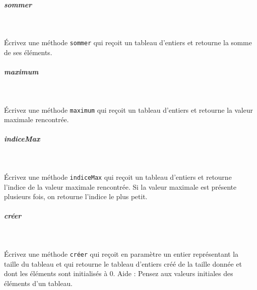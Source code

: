 \documentclass[11pt,a4paper]{article}
\begin{document}
			
		\subparagraph{sommer} 
		
					\textcolor{white}{.} \par
				
            \par
        
					\'Ecrivez une m\'ethode 
					\verb|sommer| 
					qui re\c coit un tableau d'entiers
					et retourne la somme de ses \'el\'ements.
				
            \par
        
			
		\subparagraph{maximum} 
		
					\textcolor{white}{.} \par
				
            \par
        
					\'Ecrivez une m\'ethode 
					\verb|maximum| 
					qui re\c coit un tableau d'entiers
					et retourne la valeur maximale rencontr\'ee.
				
            \par
        
			
		\subparagraph{indiceMax} 
		
					\textcolor{white}{.} \par
				
            \par
        
					\'Ecrivez une m\'ethode 
					\verb|indiceMax|
					qui re\c coit un tableau d'entiers
					et retourne l'indice de la valeur maximale rencontr\'ee.
					Si la valeur maximale est pr\'esente plusieurs fois,
					on retourne l'indice le plus petit.
				
            \par
        
			
		\subparagraph{cr\'eer} 
		
					\textcolor{white}{.} \par
				
            \par
        
					\'Ecrivez une m\'ethode 
					\verb|créer| 
					qui re\c coit en param\`etre un entier repr\'esentant 
					la taille du tableau 
					et qui retourne le tableau d'entiers 
					cr\'e\'e de la taille donn\'ee 
					et dont les \'el\'ements sont initialis\'es \`a 0.
					Aide : Pensez aux valeurs initiales
					des \'el\'ements d'un tableau.
				
            \par
        
\end{document}
